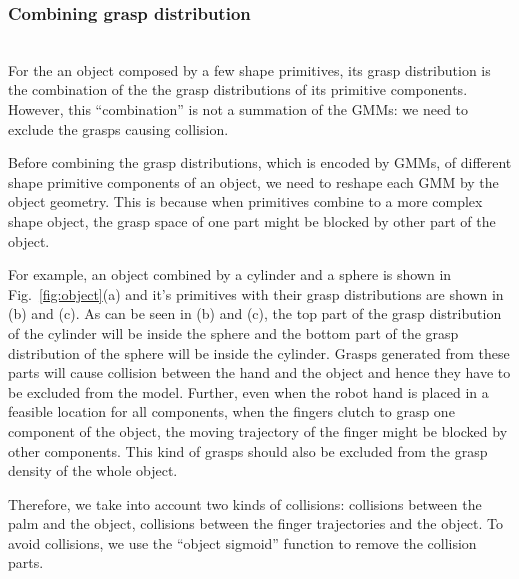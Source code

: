 \subsubsection{Combining grasp distribution} ~\\
\label{cha3:sec4:combine:combining}
For the an object composed by a few shape primitives, its grasp distribution is the combination of the the grasp distributions of its primitive components. However, this ``combination'' is not a summation of the GMMs: we need to exclude the grasps causing collision.

Before combining the grasp distributions, which is encoded by GMMs, of different shape primitive components of an object, we need to reshape each GMM by the object geometry. This is because when primitives combine to a more complex shape object, the grasp space of one part might be blocked by other part of the object.

For example, an object combined by a cylinder and a sphere is shown in Fig.~\ref{fig:object}(a) and it's primitives with their grasp distributions are shown in (b) and (c). As can be seen in (b) and (c), the top part of the grasp distribution of the cylinder will be inside the sphere and the bottom part of the grasp distribution of the sphere will be inside the cylinder. Grasps generated from these parts will cause collision between the hand and the object and hence they have to be excluded from the model. Further, even when the robot hand is placed in a feasible location for all components, when the fingers clutch to grasp one component of the object, the moving trajectory of the finger might be blocked by other components. This kind of grasps should also be excluded from the grasp density of the whole object.

Therefore, we take into account two kinds of collisions: collisions between the palm and the object, collisions between the finger trajectories and the object. To avoid collisions, we use the ``object sigmoid'' function to remove the collision parts.

